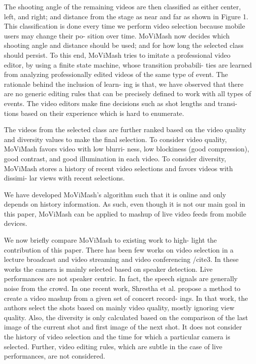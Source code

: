 \documentclass{sig-alternate}
\begin{document}
The shooting angle of the remaining videos are then classified as
either center, left, and right; and distance from the stage as near and
far as shown in Figure 1. This classification is done every time we
perform video selection because mobile users may change their po-
sition over time. MoViMash now decides which shooting angle and
distance should be used; and for how long the selected class should
persist. To this end, MoViMash tries to imitate a professional video
editor, by using a finite state machine, whose transition probabili-
ties are learned from analyzing professionally edited videos of the
same type of event. The rationale behind the inclusion of learn-
ing is that, we have observed that there are no generic editing rules
that can be precisely defined to work with all types of events. The
video editors make fine decisions such as shot lengths and transi-
tions based on their experience which is hard to enumerate.

The videos from the selected class are further ranked based on
the video quality and diversity values to make the final selection.
To consider video quality, MoViMash favors video with low blurri-
ness, low blockiness (good compression), good contrast, and good
illumination in each video. To consider diversity, MoViMash stores
a history of recent video selections and favors videos with dissimi-
lar views with recent selections.

We have developed MoViMash’s algorithm such that it is online
and only depends on history information. As such, even though
it is not our main goal in this paper, MoViMash can be applied to
mashup of live video feeds from mobile devices.

We now briefly compare MoViMash to existing work to high-
light the contribution of this paper. There has been few works on
video selection in a lecture broadcast and video streaming \cite{21} \cite{6}
and video conferencing /cite{3}. In these works the camera is mainly
selected based on speaker detection. Live performances are not
speaker centric. In fact, the speech signals are generally noise from
the crowd. In one recent work, Shrestha et al. \cite{15} propose a
method to create a video mashup from a given set of concert record-
ings. In that work, the authors select the shots based on mainly
video quality, mostly ignoring view quality. Also, the diversity is
only calculated based on the comparison of the last image of the
current shot and first image of the next shot. It does not consider
the history of video selection and the time for which a particular
camera is selected. Further, video editing rules, which are subtle in
the case of live performances, are not considered.
\end{document}
